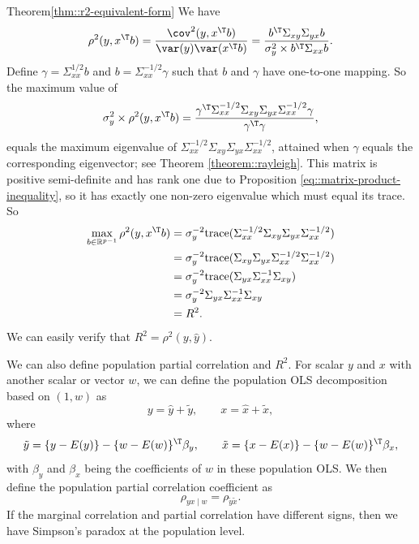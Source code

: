 \begin{myproof}{Theorem}{\ref{thm::r2-equivalent-form}}
We have 
\[
\rho ^{2}(y,x^{\T}b)=\frac{\text{\cov}^{2}(y,x^{\T}b)}{\var(y)\var(x^{\T}b)}=\frac{b^{\T}\Sigma_{xy}\Sigma_{yx}b}{\sigma_{y}^{2}\times b^{\T}\Sigma_{xx}b}.
\]
Define $\gamma=\Sigma_{xx}^{1/2}b$ and $b=\Sigma_{xx}^{-1/2}\gamma$
such that $b$ and $\gamma$ have one-to-one mapping. So the maximum value of 
\[
\sigma_{y}^{2}\times\rho ^{2}(y,x^{\T}b)=\frac{\gamma^{\T}\Sigma_{xx}^{-1/2}\Sigma_{xy}\Sigma_{yx}\Sigma_{xx}^{-1/2}\gamma}{\gamma^{\T}\gamma},
\]
equals the maximum eigenvalue of $\Sigma_{xx}^{-1/2}\Sigma_{xy}\Sigma_{yx}\Sigma_{xx}^{-1/2}$, attained when $\gamma$ equals the corresponding eigenvector; see Theorem \ref{theorem::rayleigh}. 
This matrix is positive semi-definite and has rank one due to Proposition \ref{eq::matrix-product-inequality}, so it has exactly one non-zero eigenvalue which must equal its trace. So
\begin{align*}
\max_{b \in \mathbb{R}^{p-1} }\rho ^{2}(y,x^{\T}b) & =\sigma_{y}^{-2}\text{trace}(\Sigma_{xx}^{-1/2}\Sigma_{xy}\Sigma_{yx}\Sigma_{xx}^{-1/2})\\
 & =\sigma_{y}^{-2}\text{trace}(\Sigma_{xy}\Sigma_{yx}\Sigma_{xx}^{-1/2}\Sigma_{xx}^{-1/2})\\
 & =\sigma_{y}^{-2}\text{trace}(\Sigma_{yx}\Sigma_{xx}^{-1}\Sigma_{xy})\\
 & =\sigma_{y}^{-2}\Sigma_{yx}\Sigma_{xx}^{-1}\Sigma_{xy}\\
 & =R^{2}.
\end{align*}
We can easily verify that $R^{2}= \rho ^{2}(y,\hat{y}) . $
\end{myproof}



We can also define population partial correlation and $R^{2}.$ For
scalar $y$ and $x$ with another scalar or vector $w$, we can define
the population OLS decomposition based on $(1,w)$ as
\begin{equation}
\label{eq::population-ols-decomposition}
y=\hat{y}+\tilde{y},\qquad x=\hat{x}+\tilde{x},
\end{equation} 
where 
$$ 
 \tilde{y} =  \{ y- E(y) \} - \{ w - E(w) \}^{\T}\beta_{y},\qquad 
 \tilde{x} =  \{ x- E(x) \} - \{  w-E(w) \} ^{\T}\beta_{x} ,
 $$ 
 with $\beta_{y}$ and $\beta_{x}$ being the coefficients of $w$ in these population OLS. 
We then define the population partial correlation coefficient as
\[
\rho_{yx\mid w}=\rho_{\tilde{y}\tilde{x}}.
\]
If the marginal correlation and partial correlation have different signs, then we have Simpson's paradox at the population level. 


